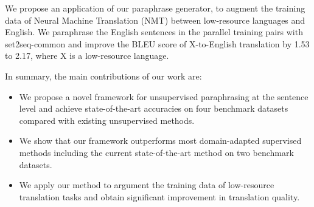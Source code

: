 
We propose an application of our paraphrase generator, 
to augment the training data of 
Neural Machine Translation (NMT) between low-resource languages and English. 
We paraphrase the English sentences in the parallel training pairs with set2seq-common and 
improve the BLEU score of X-to-English translation by 1.53 to 2.17, 
where X is a low-resource language.

In summary, the main contributions of our work are:
\begin{itemize}
\item We propose a novel framework for unsupervised paraphrasing at 
the sentence level and achieve state-of-the-art accuracies on 
four benchmark datasets compared with existing unsupervised methods.
\item We show that our framework outperforms most domain-adapted supervised methods including the current state-of-the-art method on two benchmark datasets.
\item We apply our method to argument the training data of low-resource
translation tasks and obtain significant improvement in translation quality.
\end{itemize}
